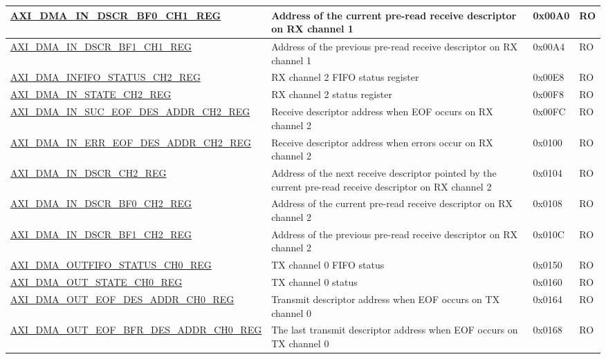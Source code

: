 \begin{longtable}{ | l | p{10cm} | p{1.3cm} | l | }
\hyperref[regdesc:AXIDMAINDSCRBF0CHNREG]{AXI\_DMA\_IN\_DSCR\_BF0\_CH1\_REG} & Address of the current pre-read receive descriptor on RX channel 1 & 0x00A0 & RO \\ \hline
\hyperref[regdesc:AXIDMAINDSCRBF1CHNREG]{AXI\_DMA\_IN\_DSCR\_BF1\_CH1\_REG} & Address of the previous pre-read receive descriptor on RX channel 1 & 0x00A4 & RO \\ \hline
\hyperref[regdesc:AXIDMAINFIFOSTATUSCHNREG]{AXI\_DMA\_INFIFO\_STATUS\_CH2\_REG} & RX channel 2 FIFO status register & 0x00E8 & RO \\ \hline
\hyperref[regdesc:AXIDMAINSTATECHNREG]{AXI\_DMA\_IN\_STATE\_CH2\_REG} & RX channel 2 status register & 0x00F8 & RO \\ \hline
\hyperref[regdesc:AXIDMAINSUCEOFDESADDRCHNREG]{AXI\_DMA\_IN\_SUC\_EOF\_DES\_ADDR\_CH2\_REG} & Receive descriptor address when EOF occurs on RX channel 2 & 0x00FC & RO \\ \hline
\hyperref[regdesc:AXIDMAINERREOFDESADDRCHNREG]{AXI\_DMA\_IN\_ERR\_EOF\_DES\_ADDR\_CH2\_REG} & Receive descriptor address when errors occur on RX channel 2 & 0x0100 & RO \\ \hline
\hyperref[regdesc:AXIDMAINDSCRCHNREG]{AXI\_DMA\_IN\_DSCR\_CH2\_REG} & Address of the next receive descriptor pointed by the current pre-read receive descriptor on RX channel 2 & 0x0104 & RO \\ \hline
\hyperref[regdesc:AXIDMAINDSCRBF0CHNREG]{AXI\_DMA\_IN\_DSCR\_BF0\_CH2\_REG} & Address of the current pre-read receive descriptor on RX channel 2 & 0x0108 & RO \\ \hline
\hyperref[regdesc:AXIDMAINDSCRBF1CHNREG]{AXI\_DMA\_IN\_DSCR\_BF1\_CH2\_REG} & Address of the previous pre-read receive descriptor on RX channel 2 & 0x010C & RO \\ \hline
\hyperref[regdesc:AXIDMAOUTFIFOSTATUSCHNREG]{AXI\_DMA\_OUTFIFO\_STATUS\_CH0\_REG} & TX channel 0 FIFO status & 0x0150 & RO \\ \hline
\hyperref[regdesc:AXIDMAOUTSTATECHNREG]{AXI\_DMA\_OUT\_STATE\_CH0\_REG} & TX channel 0 status & 0x0160 & RO \\ \hline
\hyperref[regdesc:AXIDMAOUTEOFDESADDRCHNREG]{AXI\_DMA\_OUT\_EOF\_DES\_ADDR\_CH0\_REG} & Transmit descriptor address when EOF occurs on TX channel 0 & 0x0164 & RO \\ \hline
\hyperref[regdesc:AXIDMAOUTEOFBFRDESADDRCHNREG]{AXI\_DMA\_OUT\_EOF\_BFR\_DES\_ADDR\_CH0\_REG} & The last transmit descriptor address when EOF occurs on TX channel 0 & 0x0168 & RO \\ \hline

\end{longtable}
